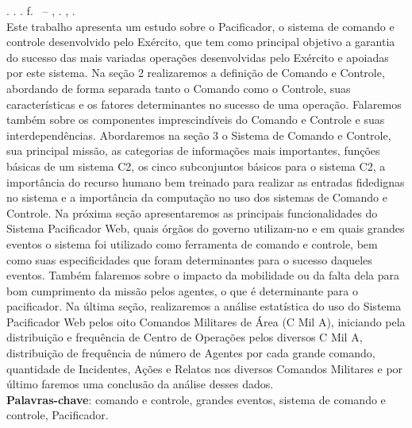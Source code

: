 % 
%


\begin{resumo}[RESUMO]
\begin{SingleSpacing}

\imprimirautorcitacao. \imprimirtitulo. \imprimirdata. \pageref {LastPage} f. \imprimirprojeto\ – \imprimirprograma, \imprimirinstituicao. \imprimirlocal, \imprimirdata.\\

Este trabalho apresenta um estudo sobre o Pacificador, o sistema de comando e controle desenvolvido pelo Exército, que tem como principal objetivo a garantia do sucesso das mais variadas operações desenvolvidas pelo Exército e apoiadas por este sistema. 
Na seção 2 realizaremos a definição de Comando e Controle, abordando de forma separada tanto o Comando como o Controle, suas características e os fatores determinantes no sucesso de uma operação. Falaremos também sobre os componentes imprescindíveis do Comando e Controle e suas interdependências.
Abordaremos na seção 3 o Sistema de Comando e Controle, sua principal missão, as categorias de informações mais importantes, funções básicas de um sistema C2, os cinco subconjuntos básicos para o sistema C2, a importância do recurso humano bem treinado para realizar as entradas fidedignas no sistema e a importância da computação no uso dos sistemas de Comando e Controle.
Na próxima seção apresentaremos as principais funcionalidades do Sistema Pacificador Web, quais órgãos do governo utilizam-no e em quais grandes eventos o sistema foi utilizado como ferramenta de comando e controle, bem como suas especificidades que foram determinantes para o sucesso daqueles eventos. Também falaremos sobre o impacto da mobilidade ou da falta dela para bom cumprimento da missão pelos agentes, o que é determinante para o pacificador.
Na última seção, realizaremos a análise estatística do uso do Sistema Pacificador Web pelos oito Comandos Militares de Área (C Mil A), iniciando pela distribuição e frequência de Centro de Operações pelos diversos C Mil A, distribuição de frequência de número de Agentes por cada grande comando, quantidade de Incidentes, Ações e Relatos nos diversos Comandos Militares e por último faremos uma conclusão da análise desses dados.
\\

\textbf{Palavras-chave}: comando e controle, grandes eventos, sistema de comando e controle, Pacificador.

\end{SingleSpacing}
\end{resumo}

